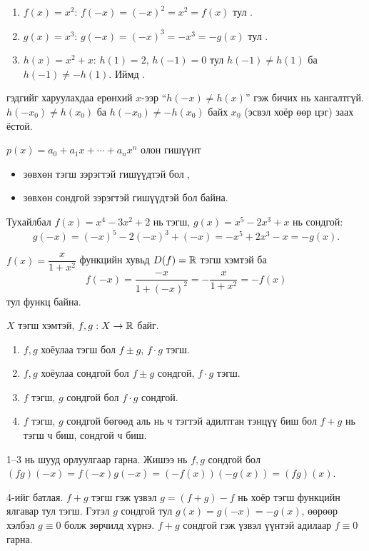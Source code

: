 \begin{example}
\leavevmode
\begin{enumerate}
  \item $f(x)=x^2$: \; $f(-x)=(-x)^2=x^2=f(x)$ тул .
  \item $g(x)=x^3$: \; $g(-x)=(-x)^3=-x^3=-g(x)$ тул .
  \item $h(x)=x^2+x$: \; $h(1)=2$, $h(-1)=0$ тул $h(-1)\neq h(1)$ ба $h(-1)\neq -h(1)$.
        Иймд .
\end{enumerate}
\end{example}

\begin{remark}
 гэдгийг харуулахдаа ерөнхий $x$-ээр
``$h(-x)\neq h(x)$'' гэж бичих нь хангалтгүй. $h(-x_0)\neq h(x_0)$ ба
$h(-x_0)\neq -h(x_0)$ байх  $x_0$ (эсвэл хоёр өөр цэг) заах ёстой.
\end{remark}

\begin{example}
$p(x)=a_0+a_1x+\cdots+a_nx^n$ олон гишүүнт
\begin{itemize}
  \item зөвхөн тэгш зэрэгтэй гишүүдтэй бол ,
  \item зөвхөн сондгой зэрэгтэй гишүүдтэй бол  байна.
\end{itemize}
Тухайлбал $f(x)=x^4-3x^2+2$ нь тэгш, $g(x)=x^5-2x^3+x$ нь сондгой:
\[
g(-x)=(-x)^5-2(-x)^3+(-x)=-x^5+2x^3-x=-g(x).
\]
\end{example}

\begin{example}
$f(x)=\dfrac{x}{1+x^2}$ функцийн хувьд $D(f)=\mathbb{R}$ тэгш хэмтэй ба
\[f(-x)=\frac{-x}{1+(-x)^2}=-\frac{x}{1+x^2}=-f(x)\]
тул  функц байна.
\end{example}

\begin{theorem}
$X$ тэгш хэмтэй, $f,g:X\to\mathbb{R}$ байг.
\begin{enumerate}
  \item $f,g$ хоёулаа тэгш бол $f\pm g$, $f\cdot g$ тэгш.
  \item $f,g$ хоёулаа сондгой бол $f\pm g$ сондгой, $f\cdot g$ тэгш.
  \item $f$ тэгш, $g$ сондгой бол $f\cdot g$ сондгой.
  \item $f$ тэгш, $g$ сондгой бөгөөд аль нь ч тэгтэй адилтган тэнцүү биш бол
        $f+g$ нь тэгш ч биш, сондгой ч биш.
\end{enumerate}
\end{theorem}
\begin{prof}
1--3 нь шууд орлуулгаар гарна. Жишээ нь $f,g$ сондгой бол
$(fg)(-x)=f(-x)g(-x)=(-f(x))(-g(x))=(fg)(x)$.

4-ийг батлая. $f+g$ тэгш гэж үзвэл $g=(f+g)-f$ нь хоёр тэгш функцийн ялгавар тул тэгш.
Гэтэл $g$ сондгой тул $g(x)=g(-x)=-g(x)$, өөрөөр хэлбэл $g\equiv0$ болж зөрчилд хүрнэ.
$f+g$ сондгой гэж үзвэл үүнтэй адилаар $f\equiv0$ гарна.
\end{prof}

